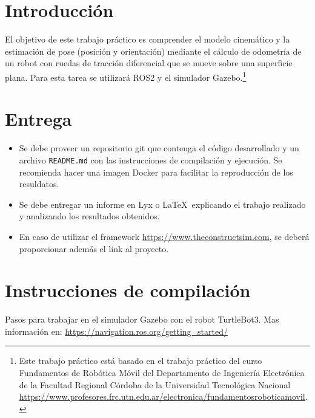 \documentclass[tp]{lcc}
\begin{document}
\maketitle


\section{Introducción}

El objetivo de este trabajo práctico es comprender el modelo cinemático y la estimación de pose (posición y orientación) mediante el cálculo de odometría de un robot con ruedas de tracción diferencial que se mueve sobre una superficie plana. Para esta tarea se utilizará ROS2 y el simulador Gazebo.\footnote{Este trabajo práctico está basado en el trabajo práctico del curso Fundamentos de Robótica Móvil del Departamento de Ingeniería Electrónica de la Facultad Regional Córdoba de la Universidad Tecnológica Nacional \url{https://www.profesores.frc.utn.edu.ar/electronica/fundamentosroboticamovil}.}


\section{Entrega}
\begin{itemize}
    \item Se debe proveer un repositorio git que contenga el código desarrollado y un archivo \lstinline{README.md} con las instrucciones de compilación y ejecución. Se recomienda hacer una imagen Docker para facilitar la reproducción de los resuldatos.

    \item Se debe entregar un informe en Lyx o \LaTeX\  explicando el trabajo realizado y analizando los resultados obtenidos.
    
    \item En caso de utilizar el framework \url{https://www.theconstructsim.com}, se deberá proporcionar además el link al proyecto.
\end{itemize}


\section{Instrucciones de compilación}
Pasos para trabajar en el simulador Gazebo con el robot TurtleBot3. Mas información en: \url{https://navigation.ros.org/getting_started/}
\end{document}
